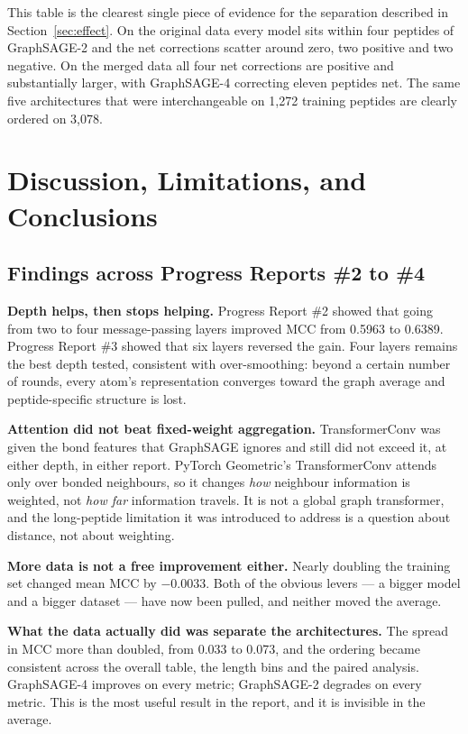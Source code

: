 \documentclass[11pt,a4paper]{article}
\begin{document}
This table is the clearest single piece of evidence for the separation described in
Section~\ref{sec:effect}. On the original data every model sits within four peptides of GraphSAGE-2 and
the net corrections scatter around zero, two positive and two negative. On the merged data all four net
corrections are positive and substantially larger, with GraphSAGE-4 correcting eleven peptides net. The
same five architectures that were interchangeable on 1{,}272 training peptides are clearly ordered on
3{,}078.

\section{Discussion, Limitations, and Conclusions}

\subsection{Findings across Progress Reports \#2 to \#4}
\textbf{Depth helps, then stops helping.} Progress Report \#2 showed that going from two to four
message-passing layers improved MCC from 0.5963 to 0.6389. Progress Report \#3 showed that six layers
reversed the gain. Four layers remains the best depth tested, consistent with over-smoothing: beyond a
certain number of rounds, every atom's representation converges toward the graph average and
peptide-specific structure is lost.

\textbf{Attention did not beat fixed-weight aggregation.} TransformerConv was given the bond features
that GraphSAGE ignores and still did not exceed it, at either depth, in either report. PyTorch Geometric's
TransformerConv attends only over bonded neighbours, so it changes \emph{how} neighbour information is
weighted, not \emph{how far} information travels. It is not a global graph transformer, and the
long-peptide limitation it was introduced to address is a question about distance, not about weighting.

\textbf{More data is not a free improvement either.} Nearly doubling the training set changed mean MCC by
$-0.0033$. Both of the obvious levers --- a bigger model and a bigger dataset --- have now been pulled,
and neither moved the average.

\textbf{What the data actually did was separate the architectures.} The spread in MCC more than doubled,
from 0.033 to 0.073, and the ordering became consistent across the overall table, the length bins and the
paired analysis. GraphSAGE-4 improves on every metric; GraphSAGE-2 degrades on every metric. This is the
most useful result in the report, and it is invisible in the average.
\end{document}
